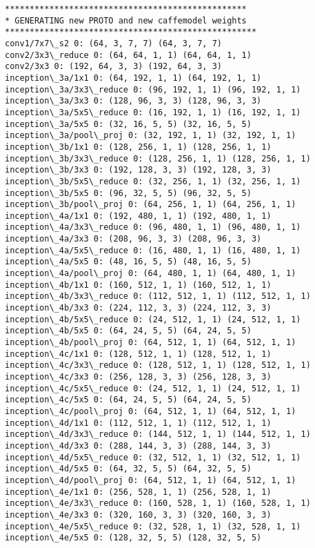 \documentclass[11pt]{article}
\begin{document}
\begin{Verbatim}[commandchars=\\\{\}]
*************************************************
* GENERATING new PROTO and new caffemodel weights  
***************************************************
conv1/7x7\_s2 0: (64, 3, 7, 7) (64, 3, 7, 7)
conv2/3x3\_reduce 0: (64, 64, 1, 1) (64, 64, 1, 1)
conv2/3x3 0: (192, 64, 3, 3) (192, 64, 3, 3)
inception\_3a/1x1 0: (64, 192, 1, 1) (64, 192, 1, 1)
inception\_3a/3x3\_reduce 0: (96, 192, 1, 1) (96, 192, 1, 1)
inception\_3a/3x3 0: (128, 96, 3, 3) (128, 96, 3, 3)
inception\_3a/5x5\_reduce 0: (16, 192, 1, 1) (16, 192, 1, 1)
inception\_3a/5x5 0: (32, 16, 5, 5) (32, 16, 5, 5)
inception\_3a/pool\_proj 0: (32, 192, 1, 1) (32, 192, 1, 1)
inception\_3b/1x1 0: (128, 256, 1, 1) (128, 256, 1, 1)
inception\_3b/3x3\_reduce 0: (128, 256, 1, 1) (128, 256, 1, 1)
inception\_3b/3x3 0: (192, 128, 3, 3) (192, 128, 3, 3)
inception\_3b/5x5\_reduce 0: (32, 256, 1, 1) (32, 256, 1, 1)
inception\_3b/5x5 0: (96, 32, 5, 5) (96, 32, 5, 5)
inception\_3b/pool\_proj 0: (64, 256, 1, 1) (64, 256, 1, 1)
inception\_4a/1x1 0: (192, 480, 1, 1) (192, 480, 1, 1)
inception\_4a/3x3\_reduce 0: (96, 480, 1, 1) (96, 480, 1, 1)
inception\_4a/3x3 0: (208, 96, 3, 3) (208, 96, 3, 3)
inception\_4a/5x5\_reduce 0: (16, 480, 1, 1) (16, 480, 1, 1)
inception\_4a/5x5 0: (48, 16, 5, 5) (48, 16, 5, 5)
inception\_4a/pool\_proj 0: (64, 480, 1, 1) (64, 480, 1, 1)
inception\_4b/1x1 0: (160, 512, 1, 1) (160, 512, 1, 1)
inception\_4b/3x3\_reduce 0: (112, 512, 1, 1) (112, 512, 1, 1)
inception\_4b/3x3 0: (224, 112, 3, 3) (224, 112, 3, 3)
inception\_4b/5x5\_reduce 0: (24, 512, 1, 1) (24, 512, 1, 1)
inception\_4b/5x5 0: (64, 24, 5, 5) (64, 24, 5, 5)
inception\_4b/pool\_proj 0: (64, 512, 1, 1) (64, 512, 1, 1)
inception\_4c/1x1 0: (128, 512, 1, 1) (128, 512, 1, 1)
inception\_4c/3x3\_reduce 0: (128, 512, 1, 1) (128, 512, 1, 1)
inception\_4c/3x3 0: (256, 128, 3, 3) (256, 128, 3, 3)
inception\_4c/5x5\_reduce 0: (24, 512, 1, 1) (24, 512, 1, 1)
inception\_4c/5x5 0: (64, 24, 5, 5) (64, 24, 5, 5)
inception\_4c/pool\_proj 0: (64, 512, 1, 1) (64, 512, 1, 1)
inception\_4d/1x1 0: (112, 512, 1, 1) (112, 512, 1, 1)
inception\_4d/3x3\_reduce 0: (144, 512, 1, 1) (144, 512, 1, 1)
inception\_4d/3x3 0: (288, 144, 3, 3) (288, 144, 3, 3)
inception\_4d/5x5\_reduce 0: (32, 512, 1, 1) (32, 512, 1, 1)
inception\_4d/5x5 0: (64, 32, 5, 5) (64, 32, 5, 5)
inception\_4d/pool\_proj 0: (64, 512, 1, 1) (64, 512, 1, 1)
inception\_4e/1x1 0: (256, 528, 1, 1) (256, 528, 1, 1)
inception\_4e/3x3\_reduce 0: (160, 528, 1, 1) (160, 528, 1, 1)
inception\_4e/3x3 0: (320, 160, 3, 3) (320, 160, 3, 3)
inception\_4e/5x5\_reduce 0: (32, 528, 1, 1) (32, 528, 1, 1)
inception\_4e/5x5 0: (128, 32, 5, 5) (128, 32, 5, 5)

\end{Verbatim}
\end{document}
